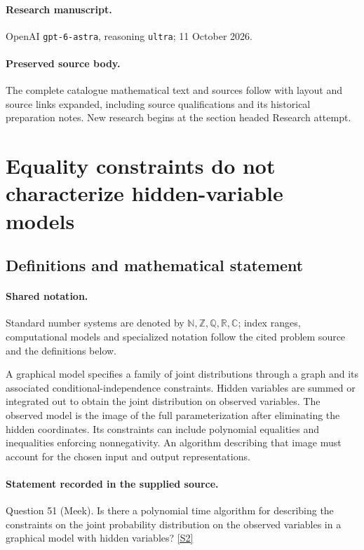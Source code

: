 \documentclass[11pt]{article}
\begin{document}
\paragraph{Research manuscript.} OpenAI \texttt{gpt-6-astra}, reasoning \texttt{ultra}; 11 October 2026.
\paragraph{Preserved source body.} The complete catalogue mathematical text and sources follow with layout and source links expanded, including source qualifications and its historical preparation notes. New research begins at the section headed Research attempt.

\section{Equality constraints do not characterize hidden-variable models}\label{statement}

\subsection{Definitions and mathematical statement}

\paragraph{Shared notation.}Standard number systems are denoted by $\mathbb N,\mathbb Z,\mathbb Q,\mathbb R,\mathbb C$; index ranges, computational models and specialized notation follow the cited problem source and the definitions below.


A graphical model specifies a family of joint distributions through a graph and its associated conditional-independence constraints. Hidden variables are summed or integrated out to obtain the joint distribution on observed variables. The observed model is the image of the full parameterization after eliminating the hidden coordinates. Its constraints can include polynomial equalities and inequalities enforcing nonnegativity. An algorithm describing that image must account for the chosen input and output representations.
\paragraph{Statement recorded in the supplied source.}
Question 51 (Meek). Is there a polynomial time algorithm for describing the constraints on the joint probability distribution on the observed variables in a graphical model with hidden variables? \href{https://aimath.org/WWN/compalgstat/compalgstat.pdf}{[S2]}
\end{document}
